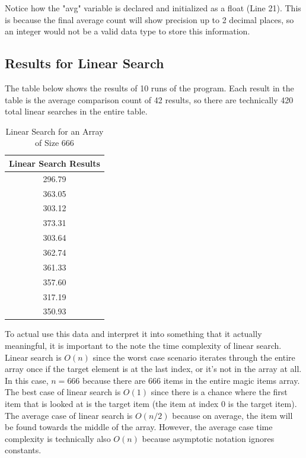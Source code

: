 \documentclass[letterpaper, 10pt]{article}
\begin{document}
\noindent
Notice how the "avg" variable is declared and initialized as a float (Line 21). This is because the final average count will show precision up to 2 decimal places, so an integer would not be a valid data type to store this information. 

\subsection{Results for Linear Search}
\noindent
The table below shows the results of 10 runs of the program. Each result in the table is the average comparison count of 42 results, so there are technically 420 total linear searches in the entire table.

\begin{table}[H]
    \centering
    \begin{tabular}{|c|}
        \hline
        \textbf{Linear Search Results} \\ \hline
        296.79 \\ 
        363.05 \\ 
        303.12 \\ 
        373.31 \\ 
        303.64 \\ 
        362.74 \\ 
        361.33 \\ 
        357.60 \\ 
        317.19 \\ 
        350.93 \\ \hline
    \end{tabular}
    \caption{Linear Search for an Array of Size 666}
    \label{tab:tab1}
\end{table}

\noindent
To actual use this data and interpret it into something that it actually meaningful, it is important to the note the time complexity of linear search. Linear search is $O(n)$ since the worst case scenario iterates through the entire array once if the target element is at the last index, or it's not in the array at all. In this case, $n = 666$ because there are 666 items in the entire magic items array. The best case of linear search is $O(1)$ since there is a chance where the first item that is looked at is the target item (the item at index 0 is the target item). The average case of linear search is $O(n / 2)$ because on average, the item will be found towards the middle of the array. However, the average case time complexity is technically also $O(n)$ because asymptotic notation ignores constants. 
\end{document}
